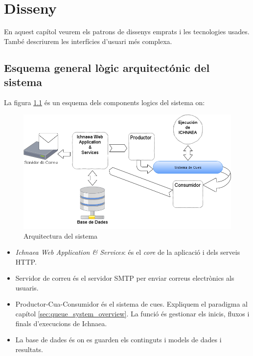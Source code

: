 \chapter{Disseny}
\label{cha:dessign}

En aquest cap\'{i}tol veurem els patrons de dissenys emprats i les tecnologies usades. Tamb\'{e} descriurem les interf\'{i}cies d'usuari m\'{e}s complexa.


\section{Esquema general l\`{o}gic arquitect\'{o}nic del sistema}
La figura \ref{fig:archsoftware} \'{e}s un esquema dels components logics del sistema on:

\begin{figure}[H]
  \includegraphics[scale=0.5]{img/design/ArchitectureSoftware.png}
  \caption{Arquitectura del sistema}
  \label{fig:archsoftware}
\end{figure}

\begin{itemize}
\item \textit{Ichnaea Web Application \& Services}: \'{e}s el \textit{core} de la aplicaci\'{o} i dels serveis HTTP.
\item Servidor de correu \'{e}s el servidor SMTP per enviar correus electr\`{o}nics als usuaris.
\item Productor-Cua-Consumidor \'{e}s el sistema de cues. Expliquem el paradigma al cap\'{i}tol \ref{sec:queue_system_overview}. La funci\'{o} \'{e}s gestionar els inicis, fluxos i finals d'execucions de Ichnaea.
\item La base de dades \'{e}s on es guarden els continguts i models de dades i resultats.
\end{itemize}

